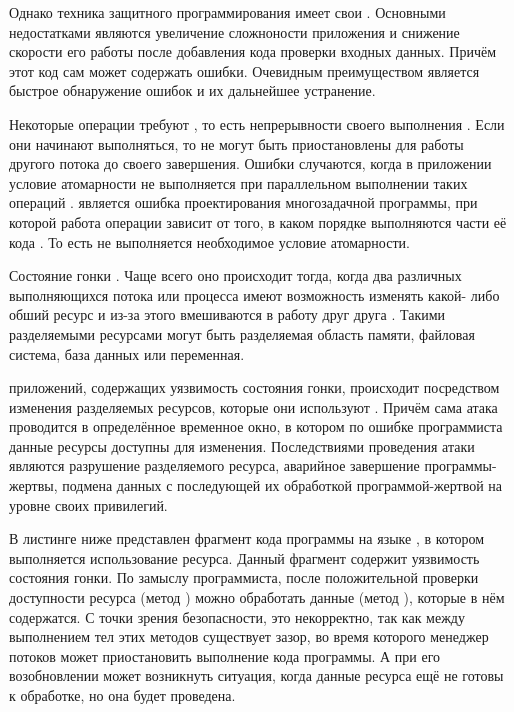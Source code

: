 %
Однако техника защитного программирования имеет свои  
. 
%
Основными недостатками являются увеличение сложноности приложения и снижение скорости его работы после добавления кода проверки входных данных. 
%
Причём этот код сам может содержать ошибки. 
%
Очевидным преимуществом является быстрое обнаружение ошибок и их дальнейшее устранение.



%
Некоторые операции требуют , то есть непрерывности своего выполнения . 
%
Если они начинают выполняться, то не могут быть приостановлены для работы другого потока до своего завершения. 
%
Ошибки случаются, когда в приложении условие атомарности не выполняется при параллельном выполнении таких операций . 
%
 является ошибка проектирования многозадачной программы, при которой работа операции зависит от того, в каком порядке выполняются части её кода . 
%
То есть не выполняется необходимое условие атомарности.

%
Состояние гонки . 
%
Чаще всего оно происходит тогда, когда два различных выполняющихся потока или процесса имеют возможность изменять какой- либо обший ресурс и из-за этого вмешиваются в работу друг друга  . 
%
Такими разделяемыми ресурсами могут быть разделяемая область памяти, файловая система, база данных или переменная. 

%
 приложений, содержащих уязвимость состояния гонки, происходит посредством изменения разделяемых ресурсов, которые они используют . 
%
Причём сама атака проводится в определённое временное окно, в котором по ошибке программиста данные ресурсы доступны для изменения. 
%
Последствиями проведения атаки являются разрушение разделяемого ресурса, аварийное завершение программы-жертвы, подмена данных с последующей их обработкой программой-жертвой на уровне своих привилегий. 

%
В листинге ниже представлен фрагмент кода программы на языке , в котором выполняется использование ресурса. 
%
Данный фрагмент содержит уязвимость состояния гонки. 
%
По замыслу программиста, после положительной проверки доступности ресурса (метод ) можно обработать данные (метод ), которые в нём содержатся. 
% 
С точки зрения безопасности, это некорректно, так как между выполнением тел этих методов существует зазор, во время которого менеджер потоков может приостановить выполнение кода программы. 
%
А при его возобновлении может возникнуть ситуация, когда данные ресурса ещё не готовы к обработке, но она будет проведена. 

